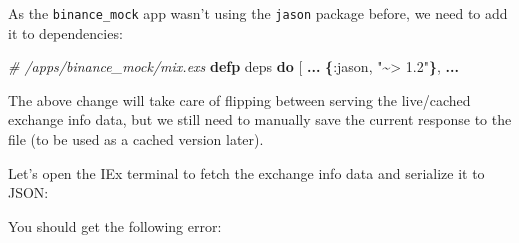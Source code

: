 \documentclass[
  oneside]{book}
\newenvironment{Shaded}{\begin{snugshade}}{\end{snugshade}}
\newcommand{\AttributeTok}[1]{\textcolor[rgb]{0.13,0.29,0.53}{#1}}
\newcommand{\CommentTok}[1]{\textcolor[rgb]{0.56,0.35,0.01}{\textit{#1}}}
\newcommand{\ErrorTok}[1]{\textcolor[rgb]{0.64,0.00,0.00}{\textbf{#1}}}
\newcommand{\ExtensionTok}[1]{#1}
\newcommand{\FunctionTok}[1]{\textcolor[rgb]{0.13,0.29,0.53}{\textbf{#1}}}
\newcommand{\KeywordTok}[1]{\textcolor[rgb]{0.13,0.29,0.53}{\textbf{#1}}}
\newcommand{\NormalTok}[1]{#1}
\newcommand{\OperatorTok}[1]{\textcolor[rgb]{0.81,0.36,0.00}{\textbf{#1}}}
\newcommand{\OtherTok}[1]{\textcolor[rgb]{0.56,0.35,0.01}{#1}}
\newcommand{\StringTok}[1]{\textcolor[rgb]{0.31,0.60,0.02}{#1}}
\newcommand{\VariableTok}[1]{\textcolor[rgb]{0.00,0.00,0.00}{#1}}
\begin{document}
As the \texttt{binance\_mock} app wasn't using the \texttt{jason} package before, we need to add it to dependencies:

\begin{Shaded}
\begin{Highlighting}[]
  \CommentTok{\# /apps/binance\_mock/mix.exs}
  \KeywordTok{defp}\NormalTok{ deps }\KeywordTok{do}
    \OtherTok{[}
      \OperatorTok{...}
      \FunctionTok{\{}\VariableTok{:jason}\NormalTok{, }\StringTok{"\textasciitilde{}\textgreater{} 1.2"}\FunctionTok{\}}\NormalTok{,}
      \OperatorTok{...}
\end{Highlighting}
\end{Shaded}

The above change will take care of flipping between serving the live/cached exchange info data, but we still need to manually save the current response to the file (to be used as a cached version later).

Let's open the IEx terminal to fetch the exchange info data and serialize it to JSON:

\begin{Shaded}
\end{Shaded}

You should get the following error:
\end{document}
